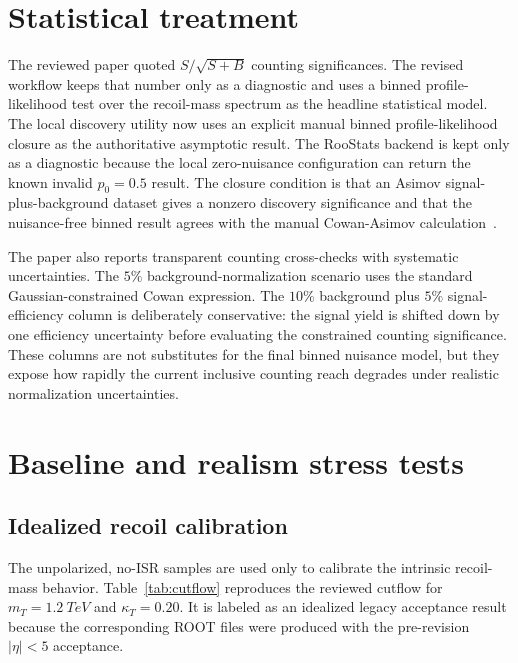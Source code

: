 \documentclass[a4paper,11pt]{article}
\begin{document}
\section{Statistical treatment}
\label{sec:statistics}

The reviewed paper quoted $S/\sqrt{S+B}$ counting significances.  The revised
workflow keeps that number only as a diagnostic and uses a binned
profile-likelihood test over the recoil-mass spectrum as the headline
statistical model.  The local discovery utility now uses an explicit manual
binned profile-likelihood closure as the authoritative asymptotic result.  The
RooStats backend is kept only as a diagnostic because the local zero-nuisance
configuration can return the known invalid $p_0=0.5$ result.  The closure
condition is that an Asimov signal-plus-background dataset gives a nonzero
discovery significance and that the nuisance-free binned result agrees with the
manual Cowan-Asimov calculation~\cite{Cowan:2010js}.

The paper also reports transparent counting cross-checks with systematic
uncertainties.  The $5\%$ background-normalization scenario uses the standard
Gaussian-constrained Cowan expression.  The $10\%$ background plus $5\%$
signal-efficiency column is deliberately conservative: the signal yield is
shifted down by one efficiency uncertainty before evaluating the constrained
counting significance.  These columns are not substitutes for the final binned
nuisance model, but they expose how rapidly the current inclusive counting
reach degrades under realistic normalization uncertainties.



\section{Baseline and realism stress tests}
\label{sec:realism}

\subsection{Idealized recoil calibration}

The unpolarized, no-ISR samples are used only to calibrate the intrinsic
recoil-mass behavior.  Table~\ref{tab:cutflow} reproduces the reviewed cutflow
for $m_T=\SI{1.2}{TeV}$ and $\kappa_T=0.20$.  It is labeled as an idealized
legacy acceptance result because the corresponding ROOT files were produced
with the pre-revision $|\eta|<5$ acceptance.
\end{document}
